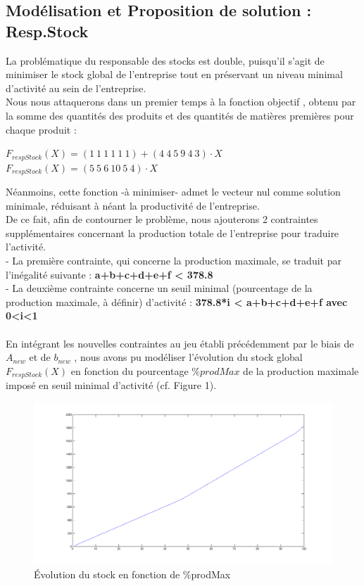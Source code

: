 \documentclass[a4paper, 11pt]{article}
\begin{document}
\subsection{Modélisation et Proposition de solution : Resp.Stock}
La problématique du responsable des stocks est double, puisqu'il s'agit de minimiser le stock global de l'entreprise tout en préservant un niveau minimal d'activité au sein de l'entreprise.\\
Nous nous attaquerons dans un premier temps à la fonction objectif , obtenu par la somme des quantités des produits et des quantités de matières premières pour chaque produit :
\begin{center}
$F_{respStock} (X) =(1~1~1~1~1~1)+(4~4~5~9~4~3)\cdot X$ \\
$F_{respStock} (X) =(5~5~6~10~5~4)\cdot X$\\
\end{center}
Néanmoins, cette fonction -à minimiser- admet le vecteur nul comme solution minimale, réduisant à néant la productivité de l'entreprise.\\
De ce fait, afin de contourner le problème, nous ajouterons 2 contraintes supplémentaires concernant la production totale de l'entreprise pour traduire l'activité.\\
- La première contrainte, qui concerne la production maximale, se traduit par l'inégalité suivante :
\textbf{a+b+c+d+e+f < 378.8}\\
- La deuxième contrainte concerne un seuil minimal (pourcentage de la production maximale, à définir) d'activité :
\textbf{ 378.8*i < a+b+c+d+e+f avec 0<i<1}\\
\\
En intégrant les nouvelles contraintes au jeu établi précédemment par le biais de \textbf{$A_{new}$} et de \textbf{$b_{new}$} , nous avons pu modéliser l'évolution du stock global $F_{respStock} (X)$ en fonction du pourcentage $\%prodMax$ de la production maximale imposé en seuil minimal d'activité (cf. Figure 1).\\
\begin{figure}[position]
    \begin{center}
        \includegraphics[scale=0.35]{Stock}
        \caption{
            \label{fig} Évolution du stock en fonction de \%prodMax
        }
    \end{center}
\end{figure}
\end{document}
